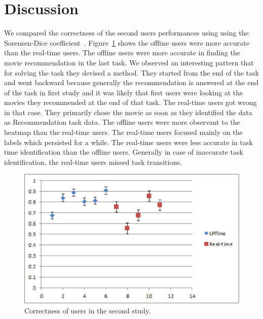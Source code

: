 ﻿\section{Discussion}
We compared the correctness of the second users performances using using the Sorensen-Dice coefficient~\cite{sorensen1948method}. Figure~\ref{fig:Scatter} shows the offline users were more accurate than the real-time users. The offline users were more accurate in finding the movie recommendation in the last task. We observed an interesting pattern that for solving the task they devised a method. They started from the end of the task and went backward because generally the recommendation is answered at the end of the task in first study and it was likely that first users were looking at the movies they recommended at the end of that task. The real-time users got wrong in that case. They primarily chose the movie as soon as they identified the data as Recommendation task data. The offline users were more observant to the heatmap than the real-time users. The real-time users focused mainly on the labels which persisted for a while. The real-time users were less accurate in task time identification than the offline users. Generally in case of inaccurate task identification, the real-time users missed task transitions. 

\begin{figure}[htb]
  \centering
  \includegraphics[width=\linewidth]{images/Scatter.eps}
  \caption{Correctness of users in the second study.}
	\label{fig:Scatter}
\end{figure} 
